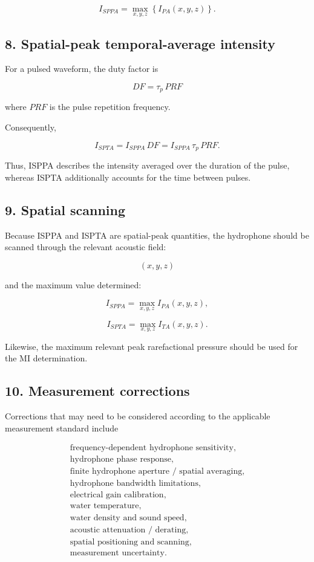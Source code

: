 \documentclass[11pt,a4paper]{article}
\begin{document}
\[
\boxed{
I_{SPPA}
=
\max_{x,y,z}
\left\{
I_{PA}(x,y,z)
\right\}.
}
\]

\subsection*{8. Spatial-peak temporal-average intensity}

For a pulsed waveform, the duty factor is

\[
\boxed{
DF=\tau_p\,PRF
}
\]

where \(PRF\) is the pulse repetition frequency.

Consequently,

\[
\boxed{
I_{SPTA}
=
I_{SPPA}\,DF
=
I_{SPPA}\,\tau_p\,PRF.
}
\]

Thus, ISPPA describes the intensity averaged over the duration of the
pulse, whereas ISPTA additionally accounts for the time between pulses.

\subsection*{9. Spatial scanning}

Because ISPPA and ISPTA are spatial-peak quantities, the hydrophone should
be scanned through the relevant acoustic field:

\[
(x,y,z)
\]

and the maximum value determined:

\[
I_{SPPA}
=
\max_{x,y,z} I_{PA}(x,y,z),
\]

\[
I_{SPTA}
=
\max_{x,y,z} I_{TA}(x,y,z).
\]

Likewise, the maximum relevant peak rarefactional pressure should be used
for the MI determination.

\subsection*{10. Measurement corrections}

Corrections that may need to be considered according to the applicable
measurement standard include

\[
\boxed{
\begin{array}{l}
\text{frequency-dependent hydrophone sensitivity},\\
\text{hydrophone phase response},\\
\text{finite hydrophone aperture / spatial averaging},\\
\text{hydrophone bandwidth limitations},\\
\text{electrical gain calibration},\\
\text{water temperature},\\
\text{water density and sound speed},\\
\text{acoustic attenuation / derating},\\
\text{spatial positioning and scanning},\\
\text{measurement uncertainty}.
\end{array}
}
\]
\end{document}
